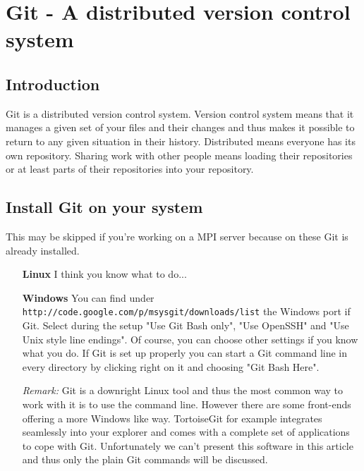 \documentclass[a4paper,10pt]{scrartcl}
\begin{document}
\section*{Git - A distributed version control system}
\subsection*{Introduction}
Git is a distributed version control system. Version control system means that it manages a given set of your files and their changes and thus makes it possible to return to any given situation in their history. Distributed means everyone has its own repository. Sharing work with other people means loading their repositories or at least parts of their repositories into your repository.

\subsection*{Install Git on your system}
This may be skipped if you're working on a MPI server because on these Git is already installed.
\begin{itemize}
  \item[\textbf{Linux}] I think you know what to do...
  \item[\textbf{Windows}] You can find under \texttt{http://code.google.com/p/msysgit/downloads/list} the Windows port if Git. Select during the setup "Use Git Bash only", "Use OpenSSH" and "Use Unix style line endings". Of course, you can choose other settings if you know what you do. If Git is set up properly you can start a Git command line in every directory by clicking right on it and choosing "Git Bash Here".
      
  \textit{Remark:} Git is a downright Linux tool and thus the most common way to work with it is to use the command line. However there are some front-ends offering a more Windows like way. TortoiseGit for example integrates seamlessly into your explorer and comes with a complete set of applications to cope with Git. Unfortunately we can't present this software in this article and thus only the plain Git commands will be discussed.
\end{itemize}
\end{document}

